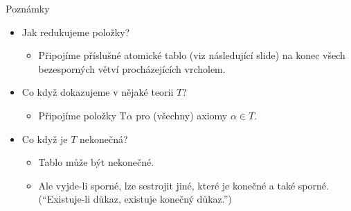 \documentclass{beamer}
\begin{document}
\begin{frame}{Poznámky}

    \begin{itemize}
        \item Jak redukujeme položky? \begin{itemize}
            \item Připojíme příslušné \alert{atomické tablo} (viz následující slide) na konec všech bezesporných větví procházejících vrcholem.
        \end{itemize}
        \item Co když dokazujeme v nějaké teorii $T$? \begin{itemize}
            \item Připojíme položky $\mathrm{T}\alpha$ pro (všechny) axiomy $\alpha\in T$.
        \end{itemize}
        \item Co když je $T$ nekonečná? \begin{itemize}
            \item Tablo může být nekonečné. 
            \item Ale vyjde-li sporné, lze sestrojit jiné, které je konečné a také sporné. (``Existuje-li důkaz, existuje konečný důkaz.'')
        \end{itemize}
    \end{itemize}

\end{frame}
\end{document}
